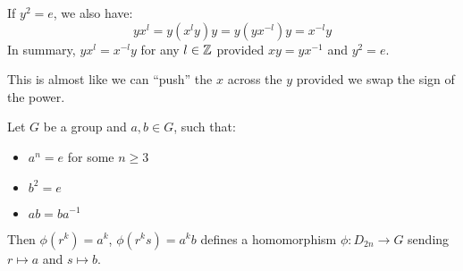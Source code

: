 \documentclass[../main.tex]{subfiles}
\begin{document}
If $y^2 = e$, we also have:
\[
  yx^{l} = y(x^{l}y)y = y(yx^{-l})y=x^{-l}y
\]
In summary, $yx^{l} = x^{-l}y$ for any $l \in \mathbb{Z}$ provided $xy = yx^{-1}$ and $y^2 = e$.
\begin{remark}[Memorisation]
  This is almost like we can ``push'' the $x$ across the $y$ provided we swap the sign of the power.
\end{remark}
\begin{lemma}
  \label{dihedralLemma}
  Let $G$ be a group and $a, b \in G$, such that:
  \begin{itemize}
    \item $a^{n} = e$ for some $n \geq 3$
    \item $b^2 = e$
    \item $ab = ba^{-1}$
  \end{itemize}
  Then $\phi(r^{k}) = a^{k}$, $\phi(r^{k}s) = a^{k}b$ defines a homomorphism $\phi: D_{2n} \to G$ sending $r \mapsto a$ and $s \mapsto b$.
\end{lemma}
\end{document}
